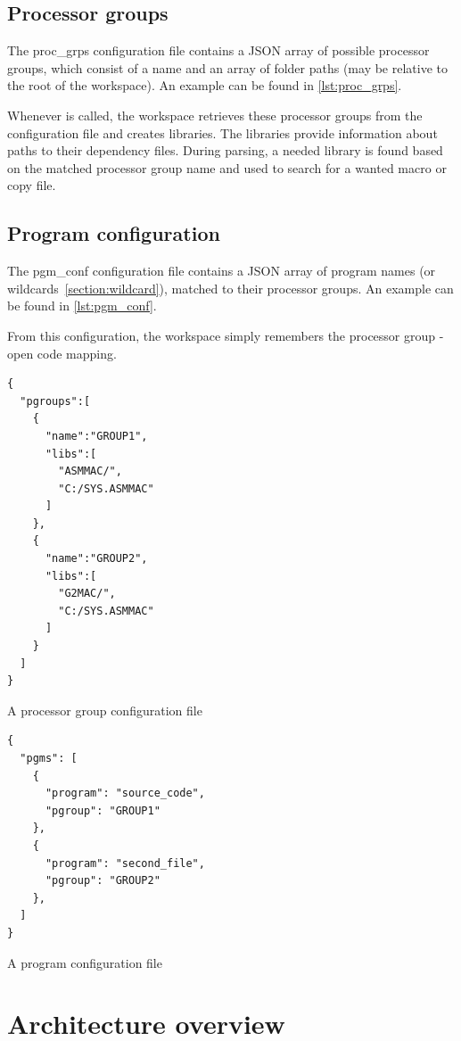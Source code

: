 \subsection{Processor groups}

The proc\_grps configuration file contains a JSON array of possible processor groups, which consist of a name and an array of folder paths (may be relative to the root of the workspace). An example can be found in \cref{lst:proc_grps}.

Whenever  is called, the workspace retrieves these processor groups from the configuration file and creates libraries. The libraries provide information about paths to their dependency files. During parsing, a needed library is found based on the matched processor group name and used to search for a wanted macro or copy file. 

\subsection{Program configuration}

The pgm\_conf configuration file contains a JSON array of program names (or wildcards~\ref{section:wildcard}), matched to their processor groups. An example can be found in \cref{lst:pgm_conf}.


From this configuration, the workspace simply remembers the processor group - open code mapping.


\begin{listing}[t]
	\begin{verbatim}
{
  "pgroups":[
    {
      "name":"GROUP1",
      "libs":[
        "ASMMAC/",
        "C:/SYS.ASMMAC"
      ]
    },
    {
      "name":"GROUP2",
      "libs":[
        "G2MAC/",
        "C:/SYS.ASMMAC"
      ]
	}
  ]
}
	\end{verbatim}
	\caption{A processor group configuration file}
	\label{lst:proc_grps}
\end{listing}

\begin{listing}[t]
	\begin{verbatim}
{
  "pgms": [
    {
      "program": "source_code",
      "pgroup": "GROUP1"
	},
	{
	  "program": "second_file",
	  "pgroup": "GROUP2"
	},
  ]
}
	\end{verbatim}
	\caption{A program configuration file}
	\label{lst:pgm_conf}
\end{listing}

\clearpage
\section{Architecture overview}

